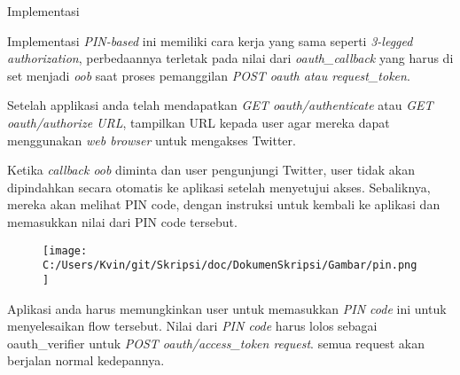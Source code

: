 Implementasi

Implementasi \textit{PIN-based} ini memiliki cara kerja yang sama seperti \textit{3-legged authorization}, perbedaannya terletak pada nilai dari \textit{oauth\_callback} yang harus di set menjadi \textit{oob} saat proses pemanggilan \textit{POST oauth atau request\_token}.

Setelah applikasi anda telah mendapatkan \textit{GET oauth/authenticate} atau \textit{GET oauth/authorize URL}, tampilkan URL kepada user agar mereka dapat menggunakan \textit{web browser} untuk mengakses Twitter.

Ketika \textit{callback oob} diminta dan user pengunjungi Twitter, user tidak akan dipindahkan secara otomatis ke aplikasi setelah menyetujui akses. Sebaliknya, mereka akan melihat PIN code, dengan instruksi untuk kembali ke aplikasi dan memasukkan nilai dari PIN code tersebut.

\begin{figure}[htbp]
	\centering
		\texttt{[image: C:/Users/Kvin/git/Skripsi/doc/DokumenSkripsi/Gambar/pin.png]}
	\label{fig:pin}
\end{figure}

Aplikasi anda harus memungkinkan user untuk memasukkan \textit{PIN code} ini untuk menyelesaikan flow tersebut. Nilai dari \textit{PIN code} harus lolos sebagai oauth\_verifier untuk \textit{POST oauth/access\_token request}. semua request akan berjalan normal kedepannya.





